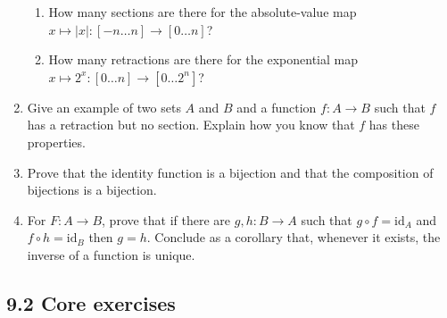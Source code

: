 \documentclass[10pt,\jkfside,a4paper]{article}
\begin{document}
\begin{enumerate}
\begin{enumerate}
\item How many sections are there for the absolute-value map $x \mapsto |x|: [-n \dots n] \rightarrow [0 \dots n]$?



\item How many retractions are there for the exponential map $x \mapsto 2^x: [0 \dots n] \rightarrow [0 \dots 2^n]$?



\end{enumerate}

\item Give an example of two sets $A$ and $B$ and a function $f: A \rightarrow B$ such that $f$ has a retraction 
but no section. Explain how you know that $f$ has these properties.



\item Prove that the identity function is a bijection and that the composition of bijections is a bijection.



\item For $F: A \rightarrow B$, prove that if there are $g, h: B \rightarrow A$ such that $g \circ f = \text{id}_A$ and 
$f \circ h = \text{id}_B$ then $g = h$. Conclude as a corollary that, whenever it exists, the inverse of a function is unique.



\end{enumerate}

\subsection*{9.2 Core exercises}
\end{document}
